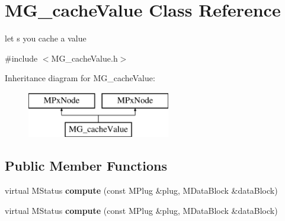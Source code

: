 \hypertarget{class_m_g__cache_value}{\section{M\-G\-\_\-cache\-Value Class Reference}
\label{class_m_g__cache_value}
}


let s you cache a value  




{\ttfamily \#include $<$M\-G\-\_\-cache\-Value.\-h$>$}

Inheritance diagram for M\-G\-\_\-cache\-Value\-:\begin{figure}[H]
\begin{center}
\leavevmode
\includegraphics[height=2.000000cm]{class_m_g__cache_value}
\end{center}
\end{figure}
\subsection*{Public Member Functions}
\begin{DoxyCompactItemize}
\item 
\hypertarget{class_m_g__cache_value_a4af2a1a4fe6b3eafd7240561616bc89d}{virtual M\-Status {\bfseries compute} (const M\-Plug \&plug, M\-Data\-Block \&data\-Block)}\label{class_m_g__cache_value_a4af2a1a4fe6b3eafd7240561616bc89d}

\item 
\hypertarget{class_m_g__cache_value_a4af2a1a4fe6b3eafd7240561616bc89d}{virtual M\-Status {\bfseries compute} (const M\-Plug \&plug, M\-Data\-Block \&data\-Block)}\label{class_m_g__cache_value_a4af2a1a4fe6b3eafd7240561616bc89d}

\end{DoxyCompactItemize}
